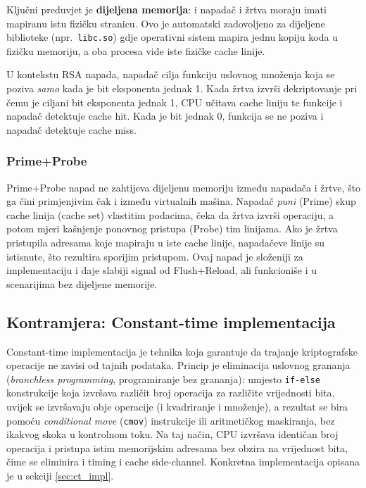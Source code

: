 Ključni preduvjet je \textbf{dijeljena memorija}: i napadač i žrtva moraju imati mapiranu istu fizičku stranicu. Ovo je automatski zadovoljeno za dijeljene biblioteke (npr.\ \texttt{libc.so}) gdje operativni sistem mapira jednu kopiju koda u fizičku memoriju, a oba procesa vide iste fizičke cache linije.

U kontekstu RSA napada, napadač cilja funkciju uslovnog množenja koja se poziva \textit{samo} kada je bit eksponenta jednak 1. Kada žrtva izvrši dekriptovanje pri čemu je ciljani bit eksponenta jednak 1, CPU učitava cache liniju te funkcije i napadač detektuje cache hit. Kada je bit jednak 0, funkcija se ne poziva i napadač detektuje cache miss.

\subsubsection{Prime+Probe}

Prime+Probe napad ne zahtijeva dijeljenu memoriju između napadača i žrtve, što ga čini primjenjivim čak i između virtualnih mašina. Napadač \textit{puni} (Prime) skup cache linija (cache set) vlastitim podacima, čeka da žrtva izvrši operaciju, a potom mjeri kašnjenje ponovnog pristupa (Probe) tim linijama. Ako je žrtva pristupila adresama koje mapiraju u iste cache linije, napadačeve linije su istisnute, što rezultira sporijim pristupom. Ovaj napad je složeniji za implementaciju i daje slabiji signal od Flush+Reload, ali funkcioniše i u scenarijima bez dijeljene memorije.

\subsection{Kontramjera: Constant-time implementacija}
\label{sec:ct_theory}

Constant-time implementacija je tehnika koja garantuje da trajanje kriptografske operacije ne zavisi od tajnih podataka. Princip je eliminacija uslovnog grananja (\textit{branchless programming}, programiranje bez grananja): umjesto \texttt{if-else} konstrukcije koja izvršava različit broj operacija za različite vrijednosti bita, uvijek se izvršavaju obje operacije (i kvadriranje i množenje), a rezultat se bira pomoću \textit{conditional move} (\texttt{cmov}) instrukcije ili aritmetičkog maskiranja, bez ikakvog skoka u kontrolnom toku. Na taj način, CPU izvršava identičan broj operacija i pristupa istim memorijskim adresama bez obzira na vrijednost bita, čime se eliminira i timing i cache side-channel. Konkretna implementacija opisana je u sekciji \ref{sec:ct_impl}.


